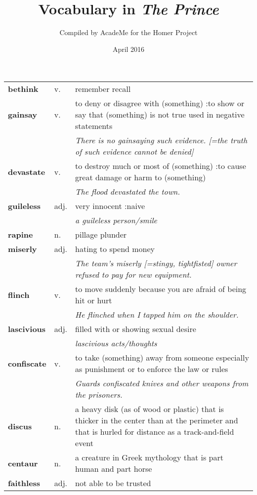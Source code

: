 \documentclass[a4paper]{article}
\title{Vocabulary in \textit{The Prince}}
\author{Compiled by AcadeMe for the Homer Project}
\date{April 2016}
\begin{document}
\maketitle
\begin{longtable}{llp{11cm}}
\textbf{bethink} & v. &  remember recall\\[0.08cm]
\textbf{gainsay} & v. &  to deny or disagree with (something) :to show or say that (something) is not true used in negative statements \\
 & & \textit{There is no gainsaying such evidence. [=the truth of such evidence cannot be denied]}\\[0.08cm]
\textbf{devastate} & v. &  to destroy much or most of (something) :to cause great damage or harm to (something) \\
 & & \textit{The flood devastated the town.}\\[0.08cm]
\textbf{guileless} & adj. &  very innocent :naive \\
 & & \textit{a guileless person/smile}\\[0.08cm]
\textbf{rapine} & n. &  pillage plunder\\[0.08cm]
\textbf{miserly} & adj. &  hating to spend money \\
 & & \textit{The team's miserly [=stingy, tightfisted] owner refused to pay for new equipment.}\\[0.08cm]
\textbf{flinch} & v. &  to move suddenly because you are afraid of being hit or hurt \\
 & & \textit{He flinched when I tapped him on the shoulder.}\\[0.08cm]
\textbf{lascivious} & adj. &  filled with or showing sexual desire \\
 & & \textit{lascivious acts/thoughts}\\[0.08cm]
\textbf{confiscate} & v. &  to take (something) away from someone especially as punishment or to enforce the law or rules \\
 & & \textit{Guards confiscated knives and other weapons from the prisoners.}\\[0.08cm]
\textbf{discus} & n. &  a heavy disk (as of wood or plastic) that is thicker in the center than at the perimeter and that is hurled for distance as a track-and-field event\\[0.08cm]
\textbf{centaur} & n. &  a creature in Greek mythology that is part human and part horse\\[0.08cm]
\textbf{faithless} & adj. &  not able to be trusted \\

\end{longtable}
\end{document}
